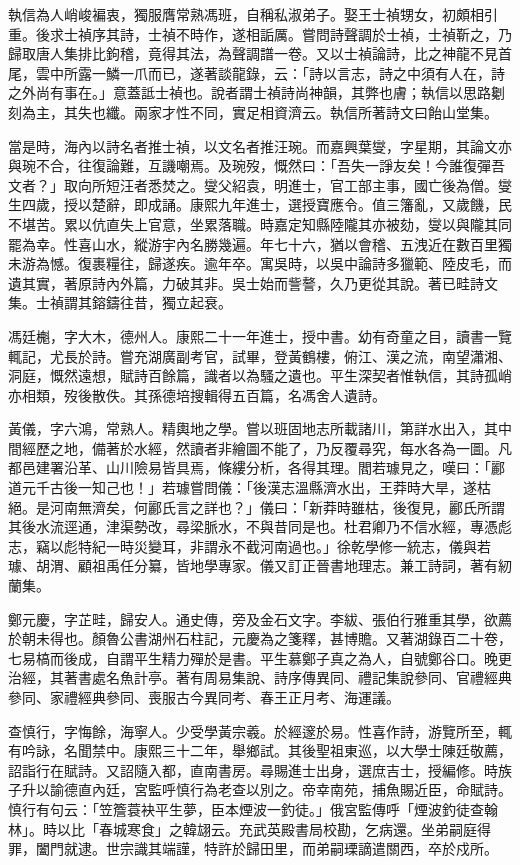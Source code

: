 \begin{pinyinscope}
執信為人峭峻褊衷，獨服膺常熟馮班，自稱私淑弟子。娶王士禎甥女，初頗相引重。後求士禎序其詩，士禎不時作，遂相詬厲。嘗問詩聲調於士禎，士禎靳之，乃歸取唐人集排比鉤稽，竟得其法，為聲調譜一卷。又以士禎論詩，比之神龍不見首尾，雲中所露一鱗一爪而已，遂著談龍錄，云：「詩以言志，詩之中須有人在，詩之外尚有事在。」意蓋詆士禎也。說者謂士禎詩尚神韻，其弊也膚；執信以思路劖刻為主，其失也纖。兩家才性不同，實足相資濟云。執信所著詩文曰飴山堂集。

當是時，海內以詩名者推士禎，以文名者推汪琬。而嘉興葉燮，字星期，其論文亦與琬不合，往復論難，互譏嘲焉。及琬歿，慨然曰：「吾失一諍友矣！今誰復彈吾文者？」取向所短汪者悉焚之。燮父紹袁，明進士，官工部主事，國亡後為僧。燮生四歲，授以楚辭，即成誦。康熙九年進士，選授寶應令。值三籓亂，又歲饑，民不堪苦。累以伉直失上官意，坐累落職。時嘉定知縣陸隴其亦被劾，燮以與隴其同罷為幸。性喜山水，縱游宇內名勝幾遍。年七十六，猶以會稽、五洩近在數百里獨未游為憾。復裹糧往，歸遂疾。逾年卒。寓吳時，以吳中論詩多獵範、陸皮毛，而遺其實，著原詩內外篇，力破其非。吳士始而訾謷，久乃更從其說。著已畦詩文集。士禎謂其鎔鑄往昔，獨立起衰。

馮廷櫆，字大木，德州人。康熙二十一年進士，授中書。幼有奇童之目，讀書一覽輒記，尤長於詩。嘗充湖廣副考官，試畢，登黃鶴樓，俯江、漢之流，南望瀟湘、洞庭，慨然遠想，賦詩百餘篇，識者以為騷之遺也。平生深契者惟執信，其詩孤峭亦相類，歿後散佚。其孫德培搜輯得五百篇，名馮舍人遺詩。

黃儀，字六鴻，常熟人。精輿地之學。嘗以班固地志所載諸川，第詳水出入，其中間經歷之地，備著於水經，然讀者非繪圖不能了，乃反覆尋究，每水各為一圖。凡都邑建署沿革、山川險易皆具焉，條縷分析，各得其理。閻若璩見之，嘆曰：「酈道元千古後一知己也！」若璩嘗問儀：「後漢志溫縣濟水出，王莽時大旱，遂枯絕。是河南無濟矣，何酈氏言之詳也？」儀曰：「新莽時雖枯，後復見，酈氏所謂其後水流逕通，津渠勢改，尋梁脈水，不與昔同是也。杜君卿乃不信水經，專憑彪志，竊以彪特紀一時災變耳，非謂永不截河南過也。」徐乾學修一統志，儀與若璩、胡渭、顧祖禹任分纂，皆地學專家。儀又訂正晉書地理志。兼工詩詞，著有紉蘭集。

鄭元慶，字芷畦，歸安人。通史傳，旁及金石文字。李紱、張伯行雅重其學，欲薦於朝未得也。顏魯公書湖州石柱記，元慶為之箋釋，甚博贍。又著湖錄百二十卷，七易槁而後成，自謂平生精力殫於是書。平生慕鄭子真之為人，自號鄭谷口。晚更治經，其著書處名魚計亭。著有周易集說、詩序傳異同、禮記集說參同、官禮經典參同、家禮經典參同、喪服古今異同考、春王正月考、海運議。

查慎行，字悔餘，海寧人。少受學黃宗羲。於經邃於易。性喜作詩，游覽所至，輒有吟詠，名聞禁中。康熙三十二年，舉鄉試。其後聖祖東巡，以大學士陳廷敬薦，詔詣行在賦詩。又詔隨入都，直南書房。尋賜進士出身，選庶吉士，授編修。時族子升以諭德直內廷，宮監呼慎行為老查以別之。帝幸南苑，捕魚賜近臣，命賦詩。慎行有句云：「笠簷蓑袂平生夢，臣本煙波一釣徒。」俄宮監傳呼「煙波釣徒查翰林」。時以比「春城寒食」之韓翃云。充武英殿書局校勘，乞病還。坐弟嗣庭得罪，闔門就逮。世宗識其端謹，特許於歸田里，而弟嗣瑮謫遣關西，卒於戍所。


\end{pinyinscope}
